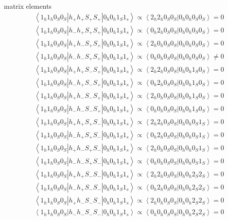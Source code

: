 matrix elements\\

\begin{equation}
\begin{split}
&\left \langle 1_h 1_h 0_S 0_S | h_+ h_+ S_+ S_+|0_h 0_h 1_S 1_s\right\rangle \propto \left \langle 2_h 2_h 0_S 0_S|0_h 0_h 0_S 0_S\right \rangle=0\\
&\left \langle 1_h 1_h 0_S 0_S | h_- h_+ S_+ S_+|0_h 0_h 1_S 1_s\right\rangle \propto \left \langle 0_h 2_h 0_S 0_S|0_h 0_h 0_S 0_S\right \rangle=0\\
&\left \langle 1_h 1_h 0_S 0_S | h_+ h_- S_+ S_+|0_h 0_h 1_S 1_s\right\rangle \propto \left \langle 2_h 0_h 0_S 0_S|0_h 0_h 0_S 0_S\right \rangle=0\\
&\left \langle 1_h 1_h 0_S 0_S | h_- h_- S_+ S_+|0_h 0_h 1_S 1_s\right\rangle \propto \left \langle 0_h 0_h 0_S 0_S|0_h 0_h 0_S 0_S\right \rangle\neq 0\\
&\left \langle 1_h 1_h 0_S 0_S | h_+ h_+ S_- S_+|0_h 0_h 1_S 1_s\right\rangle \propto \left \langle 2_h 2_h 0_S 0_S|0_h 0_h 1_S 0_S\right \rangle=0\\
&\left \langle 1_h 1_h 0_S 0_S | h_- h_+ S_- S_+|0_h 0_h 1_S 1_s\right\rangle \propto \left \langle 0_h 2_h 0_S 0_S|0_h 0_h 1_S 0_S\right \rangle=0\\
&\left \langle 1_h 1_h 0_S 0_S | h_+ h_- S_- S_+|0_h 0_h 1_S 1_s\right\rangle \propto \left \langle 2_h 0_h 0_S 0_S|0_h 0_h 1_S 0_S\right \rangle=0\\
&\left \langle 1_h 1_h 0_S 0_S | h_- h_- S_- S_+|0_h 0_h 1_S 1_s\right\rangle \propto \left \langle 0_h 0_h 0_S 0_S|0_h 0_h 1_S 0_S\right \rangle=0\\
&\left \langle 1_h 1_h 0_S 0_S | h_+ h_+ S_+ S_-|0_h 0_h 1_S 1_s\right\rangle \propto \left \langle 2_h 2_h 0_S 0_S|0_h 0_h 0_S 1_S\right \rangle=0\\
&\left \langle 1_h 1_h 0_S 0_S | h_- h_+ S_+ S_-|0_h 0_h 1_S 1_s\right\rangle \propto \left \langle 0_h 2_h 0_S 0_S|0_h 0_h 0_S 1_S\right \rangle=0\\
&\left \langle 1_h 1_h 0_S 0_S | h_+ h_- S_+ S_-|0_h 0_h 1_S 1_s\right\rangle \propto \left \langle 2_h 0_h 0_S 0_S|0_h 0_h 0_S 1_S\right \rangle=0\\
&\left \langle 1_h 1_h 0_S 0_S | h_- h_- S_+ S_-|0_h 0_h 1_S 1_s\right\rangle \propto \left \langle 0_h 0_h 0_S 0_S|0_h 0_h 0_S 1_S\right \rangle=0\\
&\left \langle 1_h 1_h 0_S 0_S | h_+ h_+ S_- S_-|0_h 0_h 1_S 1_s\right\rangle \propto \left \langle 2_h 2_h 0_S 0_S|0_h 0_h 2_S 2_S\right \rangle=0\\
&\left \langle 1_h 1_h 0_S 0_S | h_- h_+ S_- S_-|0_h 0_h 1_S 1_s\right\rangle \propto \left \langle 0_h 2_h 0_S 0_S|0_h 0_h 2_S 2_S\right \rangle=0\\
&\left \langle 1_h 1_h 0_S 0_S | h_+ h_- S_- S_-|0_h 0_h 1_S 1_s\right\rangle \propto \left \langle 2_h 0_h 0_S 0_S|0_h 0_h 2_S 2_S\right \rangle=0\\
&\left \langle 1_h 1_h 0_S 0_S | h_- h_- S_- S_-|0_h 0_h 1_S 1_s\right\rangle \propto \left \langle 0_h 0_h 0_S 0_S|0_h 0_h 2_S 2_S\right \rangle=0
\end{split}
\end{equation}

